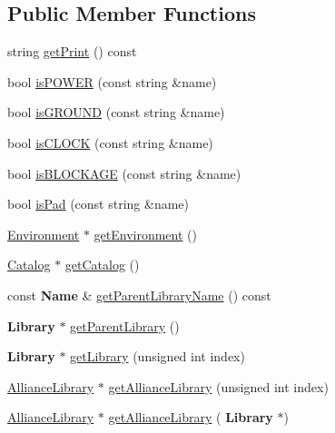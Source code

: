 \subsection*{Public Member Functions}
\begin{DoxyCompactItemize}
\item 
string \mbox{\hyperlink{classCRL_1_1AllianceFramework_ab142ba712b0e6388e45bb8d2fa05d93e}{get\+Print}} () const
\item 
bool \mbox{\hyperlink{classCRL_1_1AllianceFramework_adc7dc5aa7e84b1fd94bc4a29bc6260e1}{is\+P\+O\+W\+ER}} (const string \&name)
\item 
bool \mbox{\hyperlink{classCRL_1_1AllianceFramework_a0dcd1a667226f37353fdf0ea232d9c5d}{is\+G\+R\+O\+U\+ND}} (const string \&name)
\item 
bool \mbox{\hyperlink{classCRL_1_1AllianceFramework_a79ae573b6b685c1796e29ccc15c1c146}{is\+C\+L\+O\+CK}} (const string \&name)
\item 
bool \mbox{\hyperlink{classCRL_1_1AllianceFramework_aa41d24d292c19624236fff250a28b102}{is\+B\+L\+O\+C\+K\+A\+GE}} (const string \&name)
\item 
bool \mbox{\hyperlink{classCRL_1_1AllianceFramework_a0c48b5b15d769c6f17c4098dcaf46bcd}{is\+Pad}} (const string \&name)
\item 
\mbox{\hyperlink{classCRL_1_1Environment}{Environment}} $\ast$ \mbox{\hyperlink{classCRL_1_1AllianceFramework_a8e044592d2ceaea0060aec5dc5cc6900}{get\+Environment}} ()
\item 
\mbox{\hyperlink{classCRL_1_1Catalog}{Catalog}} $\ast$ \mbox{\hyperlink{classCRL_1_1AllianceFramework_a036bd6fa8f837c81f60b9d424f817add}{get\+Catalog}} ()
\item 
const \textbf{ Name} \& \mbox{\hyperlink{classCRL_1_1AllianceFramework_a4f1d2d34c254ac596e8c4a408ef6ba43}{get\+Parent\+Library\+Name}} () const
\item 
\textbf{ Library} $\ast$ \mbox{\hyperlink{classCRL_1_1AllianceFramework_afe822e9e04b613862aec5066743e1ffd}{get\+Parent\+Library}} ()
\item 
\textbf{ Library} $\ast$ \mbox{\hyperlink{classCRL_1_1AllianceFramework_ab6f9ac0f07b20c2444b13ef8bc55c9ea}{get\+Library}} (unsigned int index)
\item 
\mbox{\hyperlink{classCRL_1_1AllianceLibrary}{Alliance\+Library}} $\ast$ \mbox{\hyperlink{classCRL_1_1AllianceFramework_a4085f3bc96ca5e4bf2d41a4ada9658f2}{get\+Alliance\+Library}} (unsigned int index)
\item 
\mbox{\hyperlink{classCRL_1_1AllianceLibrary}{Alliance\+Library}} $\ast$ \mbox{\hyperlink{classCRL_1_1AllianceFramework_a8e007b3f2ac45feec2907f77530a718c}{get\+Alliance\+Library}} (\textbf{ Library} $\ast$)

\end{DoxyCompactItemize}
